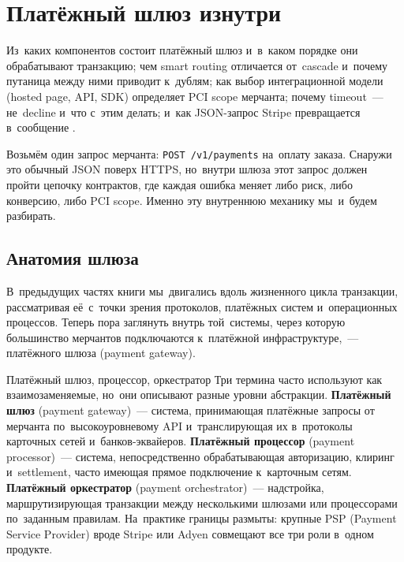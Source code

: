 \chapter{Платёжный шлюз изнутри}
\label{ch:gateway}

\begin{kaobox}[title=Что вы узнаете из этой главы]
  Из~каких компонентов состоит платёжный шлюз и~в~каком порядке
  они обрабатывают транзакцию; чем smart routing отличается от~cascade
  и~почему путаница между ними приводит к~дублям; как выбор
  интеграционной модели (hosted page, API, SDK) определяет PCI scope
  мерчанта; почему timeout~--- не~decline и~что с~этим делать;
  и~как JSON-запрос Stripe превращается в~сообщение .
\end{kaobox}

Возьмём один запрос мерчанта: \texttt{POST /v1/payments} на~оплату
заказа. Снаружи это обычный JSON поверх HTTPS, но~внутри шлюза
этот запрос должен пройти цепочку контрактов, где каждая ошибка
меняет либо риск, либо конверсию, либо PCI scope. Именно эту
внутреннюю механику мы~и~будем разбирать.

\section{Анатомия шлюза}
\label{sec:gw-anatomy}

В~предыдущих частях книги мы~двигались вдоль жизненного цикла
транзакции, рассматривая её~с~точки зрения протоколов, платёжных
систем и~операционных процессов. Теперь пора заглянуть внутрь
той~системы, через которую большинство мерчантов подключаются
к~платёжной инфраструктуре,~--- платёжного шлюза (payment gateway).

\begin{termdef}{Платёжный шлюз, процессор, оркестратор}
  Три термина часто используют как взаимозаменяемые, но~они описывают
  разные уровни абстракции. \textbf{Платёжный шлюз} (payment gateway)~---
  система, принимающая платёжные запросы от мерчанта по~высокоуровневому
  API и~транслирующая их в~протоколы карточных сетей и~банков-эквайеров.
  \textbf{Платёжный процессор} (payment processor)~--- система,
  непосредственно обрабатывающая авторизацию, клиринг и~settlement,
  часто имеющая прямое подключение к~карточным сетям.
  \textbf{Платёжный оркестратор} (payment orchestrator)~--- надстройка,
  маршрутизирующая транзакции между несколькими шлюзами или процессорами
  по~заданным правилам. На~практике границы размыты: крупные PSP
  (Payment Service Provider) вроде Stripe или Adyen совмещают все три
  роли в~одном продукте.
\end{termdef}

